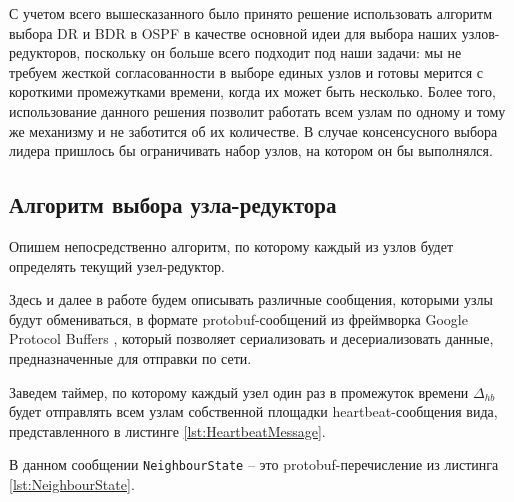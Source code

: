 \documentclass{article}
\theoremstyle{plain}
\theoremstyle{plain}
\theoremstyle{plain}
\theoremstyle{plain}
\theoremstyle{definition}
\theoremstyle{remark}
\theoremstyle{plain}
\begin{document}
С учетом всего вышесказанного было принято решение использовать алгоритм выбора DR и BDR в OSPF в качестве основной идеи для выбора наших узлов-редукторов, поскольку он больше всего подходит под наши задачи: мы не требуем жесткой согласованности в выборе единых узлов и готовы мерится с короткими промежутками времени, когда их может быть несколько. Более того, использование данного решения позволит работать всем узлам по одному и тому же механизму и не заботится об их количестве. В случае консенсусного выбора лидера пришлось бы ограничивать набор узлов, на котором он бы выполнялся.

\subsection{Алгоритм выбора узла-редуктора}
\label{ReducersElectionSubsection}

Опишем непосредственно алгоритм, по которому каждый из узлов будет определять текущий узел-редуктор.

Здесь и далее в работе будем описывать различные сообщения, которыми узлы будут обмениваться, в формате protobuf-сообщений из фреймворка Google Protocol Buffers \cite{Google_protobuf}, который позволяет сериализовать и десериализовать данные, предназначенные для отправки по сети.

Заведем таймер, по которому каждый узел один раз в промежуток времени $\Delta_{hb}$ будет отправлять всем узлам собственной площадки heartbeat-сообщения вида, представленного в листинге \ref{lst:HeartbeatMessage}.


В данном сообщении \texttt{NeighbourState} -- это protobuf-перечисление из листинга \ref{lst:NeighbourState}.

\end{document}
